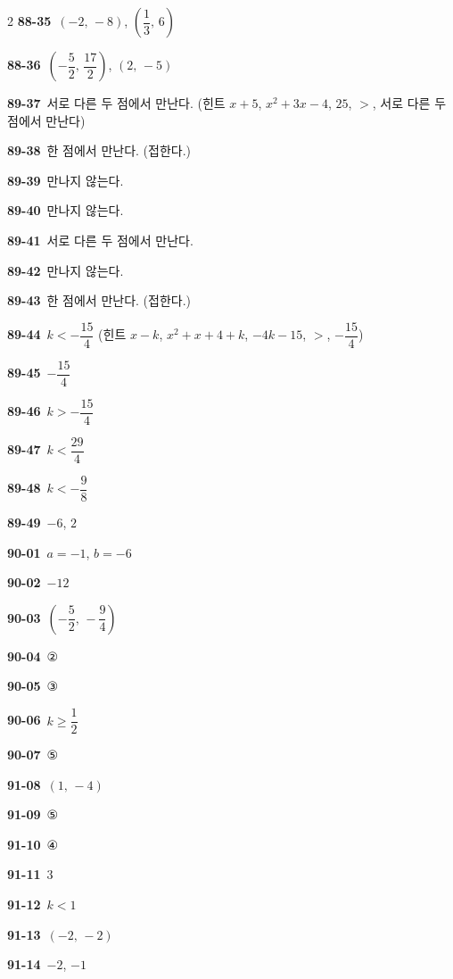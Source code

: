 \documentclass[10pt,a4paper]{article}
\begin{document}
\begin{multicols}{2}
\noindent\textbf{88-35}\ $(-2,\,-8)$, $\left(\dfrac{1}{3},\,6\right)$\par
\noindent\textbf{88-36}\ $\left(-\dfrac{5}{2},\,\dfrac{17}{2}\right)$, $(2,\,-5)$\par
\noindent\textbf{89-37}\ 서로 다른 두 점에서 만난다. (힌트 $x+5$, $x^2+3x-4$, $25$, $>$, 서로 다른 두 점에서 만난다)\par
\noindent\textbf{89-38}\ 한 점에서 만난다. (접한다.)\par
\noindent\textbf{89-39}\ 만나지 않는다.\par
\noindent\textbf{89-40}\ 만나지 않는다.\par
\noindent\textbf{89-41}\ 서로 다른 두 점에서 만난다.\par
\noindent\textbf{89-42}\ 만나지 않는다.\par
\noindent\textbf{89-43}\ 한 점에서 만난다. (접한다.)\par
\noindent\textbf{89-44}\ $k<-\dfrac{15}{4}$ (힌트 $x-k$, $x^2+x+4+k$, $-4k-15$, $>$, $-\dfrac{15}{4}$)\par
\noindent\textbf{89-45}\ $-\dfrac{15}{4}$\par
\noindent\textbf{89-46}\ $k>-\dfrac{15}{4}$\par
\noindent\textbf{89-47}\ $k<\dfrac{29}{4}$\par
\noindent\textbf{89-48}\ $k<-\dfrac{9}{8}$\par
\noindent\textbf{89-49}\ $-6$, $2$\par
\noindent\textbf{90-01}\ $a=-1$, $b=-6$\par
\noindent\textbf{90-02}\ $-12$\par
\noindent\textbf{90-03}\ $\left(-\dfrac{5}{2},\,-\dfrac{9}{4}\right)$\par
\noindent\textbf{90-04}\ ②\par
\noindent\textbf{90-05}\ ③\par
\noindent\textbf{90-06}\ $k\ge\dfrac{1}{2}$\par
\noindent\textbf{90-07}\ ⑤\par
\noindent\textbf{91-08}\ $(1,\,-4)$\par
\noindent\textbf{91-09}\ ⑤\par
\noindent\textbf{91-10}\ ④\par
\noindent\textbf{91-11}\ $3$\par
\noindent\textbf{91-12}\ $k<1$\par
\noindent\textbf{91-13}\ $(-2,\,-2)$\par
\noindent\textbf{91-14}\ $-2$, $-1$\par

\end{multicols}
\end{document}
